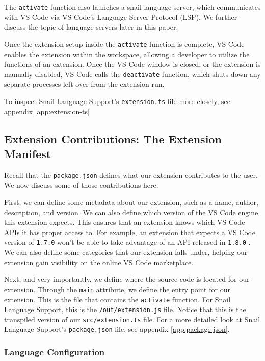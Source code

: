 \documentclass{article}
\begin{document}
The \lstinline{activate} function also launches a snail language server, which communicates with VS Code via VS Code's Language Server Protocol (LSP). We further discuss the topic of language servers later in this paper.

Once the extension setup inside the \lstinline{activate} function is complete, VS Code enables the extension within the workspace, allowing a developer to utilize the functions of an extension. Once the VS Code window is closed, or the extension is manually disabled, VS Code calls the \lstinline{deactivate} function, which shuts down any separate processes left over from the extension run.

To inspect Snail Language Support's \lstinline{extension.ts} file more closely, see appendix \ref{app:extension-ts}

\subsection{Extension Contributions: The Extension Manifest}

Recall that the \lstinline{package.json} defines what our extension contributes to the user. We now discuss some of those contributions here.

First, we can define some metadata about our extension, such as a name, author, description, and version. We can also define which version of the VS Code engine this extension expects. This ensures that an extension knows which VS Code APIs it has proper access to. For example, an extension that expects a VS Code version of \lstinline{1.7.0} won't be able to take advantage of an API released in \lstinline{1.8.0} \cite{Microsoft_2023e}. We can also define some categories that our extension falls under, helping our extension gain visibility on the online VS Code marketplace.

Next, and very importantly, we define where the source code is located for our extension. Through the \lstinline{main} attribute, we define the entry point for our extension. This is the file that contains the \lstinline{activate} function. For Snail Language Support, this is the \lstinline{/out/extension.js} file. Notice that this is the transpiled version of our \lstinline{src/extension.ts} file. For a more detailed look at Snail Language Support's \lstinline{package.json} file, see appendix \ref{app:package-json}.

\subsubsection{Language Configuration}
\end{document}
